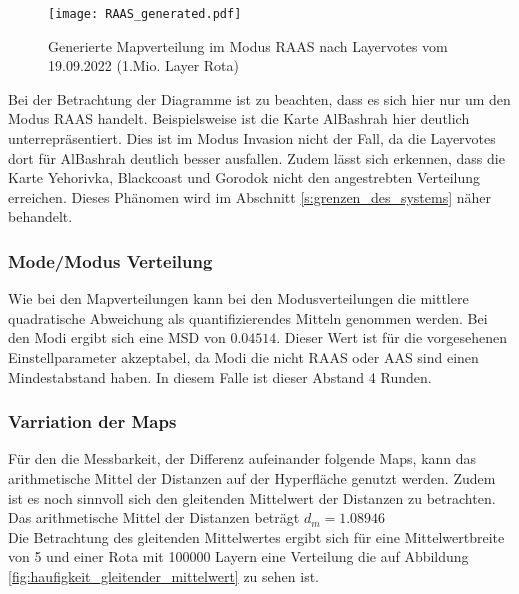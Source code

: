             \begin{figure}[htbp]
                \centering
                \texttt{[image: RAAS\_generated.pdf]}
                \caption{Generierte Mapverteilung im Modus RAAS nach Layervotes vom 19.09.2022 (1.Mio. Layer Rota)}
                \label{fig:generated_mapverteilung_raas}
            \end{figure}

            Bei der Betrachtung der Diagramme
            ist zu beachten, dass es sich hier nur um den Modus RAAS handelt.
            Beispielsweise ist die Karte AlBashrah hier deutlich unterrepräsentiert. Dies ist im Modus Invasion
            nicht der Fall, da die Layervotes dort für AlBashrah deutlich besser ausfallen.
            Zudem lässt sich erkennen, dass die Karte Yehorivka, Blackcoast und Gorodok nicht den angestrebten
            Verteilung erreichen. Dieses Phänomen wird im Abschnitt \ref{s:grenzen_des_systems} näher behandelt.

        \subsubsection{Mode/Modus Verteilung}
            Wie bei den Mapverteilungen kann bei den Modusverteilungen die mittlere quadratische Abweichung als
            quantifizierendes Mitteln genommen werden. Bei den Modi ergibt sich eine MSD von $0.04514$.
            Dieser Wert ist für die vorgesehenen Einstellparameter akzeptabel, da Modi die nicht RAAS oder AAS sind
            einen Mindestabstand haben. In diesem Falle ist dieser Abstand 4 Runden.\\
        \subsubsection{Varriation der Maps}
            Für den die Messbarkeit, der Differenz aufeinander folgende Maps, kann das arithmetische Mittel der Distanzen
            auf der Hyperfläche genutzt werden. Zudem ist es noch sinnvoll sich den gleitenden Mittelwert der Distanzen
            zu betrachten.\\
            Das arithmetische Mittel der Distanzen beträgt $d_m = 1.08946$\\
            Die Betrachtung des gleitenden Mittelwertes ergibt sich für eine Mittelwertbreite von 5 und einer Rota mit 100000 Layern
            eine Verteilung die auf Abbildung \ref{fig:haufigkeit_gleitender_mittelwert} zu sehen ist.

